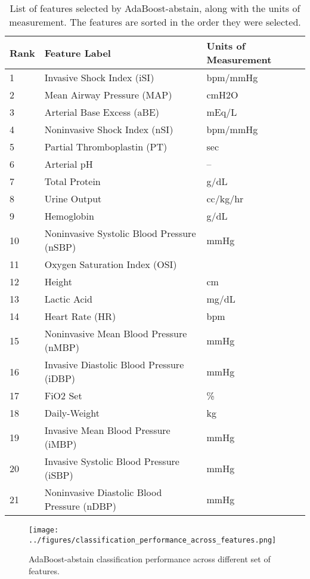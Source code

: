 \documentclass[
   technote
]{phildoc}
\begin{document}
\begin{table}[h!]
\center
\caption{List of features selected by AdaBoost-abstain, along with the units of measurement. The features are sorted in the order they were selected.}
\label{tab:included_features}
\begin{tabular}{|l|l|l|}
	\hline
	\textbf{Rank} & \textbf{Feature Label} & \textbf{Units of Measurement} \\
	\hline
	\hline
	1 & Invasive Shock Index (iSI) & bpm/mmHg \\
	\hline
	2 & Mean Airway Pressure (MAP) & cmH2O \\
	\hline
	3 & Arterial Base Excess (aBE) & mEq/L \\
	\hline
	4 & Noninvasive Shock Index (nSI) & bpm/mmHg\\
	\hline
	5 & Partial Thromboplastin (PT) & sec \\
	\hline
	6 & Arterial pH & -- \\
	\hline
	7 & Total Protein & g/dL \\
	\hline
	8 & Urine Output & cc/kg/hr\\
	\hline
	9 & Hemoglobin & g/dL\\
	\hline
	10 & Noninvasive Systolic Blood Pressure (nSBP) & mmHg \\
	\hline
	11 & Oxygen Saturation Index (OSI) & \\
	\hline
	12 & Height & cm \\
	\hline
	13 & Lactic Acid & mg/dL \\
	\hline
	14 & Heart Rate (HR) & bpm \\
	\hline
	15 & Noninvasive Mean Blood Pressure (nMBP) & mmHg \\
	\hline
	16 & Invasive Diastolic Blood Pressure (iDBP) & mmHg \\
	\hline
	17 & FiO2 Set & \% \\
	\hline
	18 & Daily-Weight & kg \\
	\hline
	19 & Invasive Mean Blood Pressure (iMBP) & mmHg \\
	\hline
	20 & Invasive Systolic Blood Pressure (iSBP) & mmHg \\
	\hline
	21 & Noninvasive Diastolic Blood Pressure (nDBP) & mmHg \\	
	\hline
\end{tabular}
\end{table}
    

\begin{figure}[h!]
	\centering
	\texttt{[image: ../figures/classification\_performance\_across\_features.png]}
	\caption{AdaBoost-abstain classification performance across different set of features.} 
	\label{fig:clf_across_features}      
\end{figure}
\end{document}
